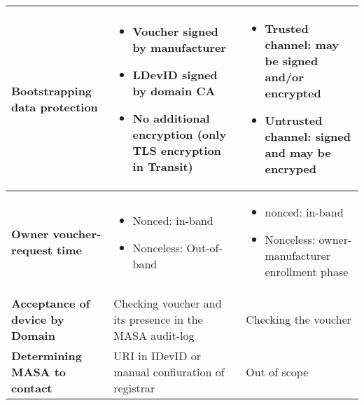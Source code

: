 \begin{landscape}
\begin{longtable}{|p{5cm}|l|l|}
		\hline
		\rowcolor[rgb]{ .745,  .804,  .843} \textbf{Bootstrapping data protection} & \multicolumn{1}{p{18.335em}|}{\cellcolor[rgb]{ 1,  1,  1}
			\begin{itemize}[leftmargin=*, topsep=0pt, noitemsep]
			\item
			 Voucher signed by manufacturer
			\item
			 LDevID signed by domain CA
			\item
			 No additional encryption (only TLS encryption in Transit)
		\end{itemize}
		 	} & \multicolumn{1}{p{18.335em}|}{\cellcolor[rgb]{ 1,  1,  1}
			\begin{itemize}[leftmargin=*, topsep=0pt, noitemsep]
			\item
			 Trusted channel: may be signed and/or encrypted
			\item
			 Untrusted channel: signed and may be encryped
		\end{itemize}
		 } \bigstrut\\

		\hline
		\rowcolor[rgb]{ .745,  .804,  .843} \textbf{Owner voucher-request time} & \multicolumn{1}{p{18.335em}|}{\cellcolor[rgb]{ 1,  1,  1}
		\begin{itemize}[leftmargin=*, topsep=0pt, noitemsep]
		\item
			Nonced: in-band
		\item
			Nonceless: Out-of-band
		\end{itemize}
		} & \multicolumn{1}{p{18.335em}|}{\cellcolor[rgb]{ 1,  1,  1}
		\begin{itemize}[leftmargin=*, topsep=0pt, noitemsep]
		\item
			nonced: in-band
		\item
			Nonceless: owner-manufacturer enrollment phase
		\end{itemize}
	} \bigstrut\\

		\hline
		\rowcolor[rgb]{ .745,  .804,  .843} \textbf{Acceptance of device by Domain} & \multicolumn{1}{p{18.335em}|}{\cellcolor[rgb]{ 1,  1,  1}Checking voucher and its presence in the MASA audit-log} & \cellcolor[rgb]{ 1,  1,  1}Checking the voucher \bigstrut\\

		\hline
		\rowcolor[rgb]{ .745,  .804,  .843} \textbf{Determining MASA to contact} & \multicolumn{1}{p{18.335em}|}{\cellcolor[rgb]{ 1,  1,  1}URI in IDevID or manual confiuration of registrar} & \cellcolor[rgb]{ 1,  1,  1}Out of scope \bigstrut\\


\end{longtable}
\end{landscape}
